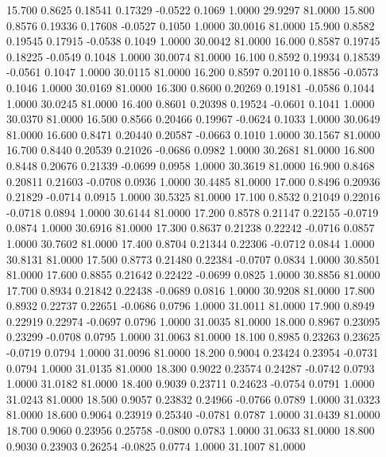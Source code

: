   15.700   0.8625   0.18541   0.17329  -0.0522   0.1069   1.0000  29.9297  81.0000
  15.800   0.8576   0.19336   0.17608  -0.0527   0.1050   1.0000  30.0016  81.0000
  15.900   0.8582   0.19545   0.17915  -0.0538   0.1049   1.0000  30.0042  81.0000
  16.000   0.8587   0.19745   0.18225  -0.0549   0.1048   1.0000  30.0074  81.0000
  16.100   0.8592   0.19934   0.18539  -0.0561   0.1047   1.0000  30.0115  81.0000
  16.200   0.8597   0.20110   0.18856  -0.0573   0.1046   1.0000  30.0169  81.0000
  16.300   0.8600   0.20269   0.19181  -0.0586   0.1044   1.0000  30.0245  81.0000
  16.400   0.8601   0.20398   0.19524  -0.0601   0.1041   1.0000  30.0370  81.0000
  16.500   0.8566   0.20466   0.19967  -0.0624   0.1033   1.0000  30.0649  81.0000
  16.600   0.8471   0.20440   0.20587  -0.0663   0.1010   1.0000  30.1567  81.0000
  16.700   0.8440   0.20539   0.21026  -0.0686   0.0982   1.0000  30.2681  81.0000
  16.800   0.8448   0.20676   0.21339  -0.0699   0.0958   1.0000  30.3619  81.0000
  16.900   0.8468   0.20811   0.21603  -0.0708   0.0936   1.0000  30.4485  81.0000
  17.000   0.8496   0.20936   0.21829  -0.0714   0.0915   1.0000  30.5325  81.0000
  17.100   0.8532   0.21049   0.22016  -0.0718   0.0894   1.0000  30.6144  81.0000
  17.200   0.8578   0.21147   0.22155  -0.0719   0.0874   1.0000  30.6916  81.0000
  17.300   0.8637   0.21238   0.22242  -0.0716   0.0857   1.0000  30.7602  81.0000
  17.400   0.8704   0.21344   0.22306  -0.0712   0.0844   1.0000  30.8131  81.0000
  17.500   0.8773   0.21480   0.22384  -0.0707   0.0834   1.0000  30.8501  81.0000
  17.600   0.8855   0.21642   0.22422  -0.0699   0.0825   1.0000  30.8856  81.0000
  17.700   0.8934   0.21842   0.22438  -0.0689   0.0816   1.0000  30.9208  81.0000
  17.800   0.8932   0.22737   0.22651  -0.0686   0.0796   1.0000  31.0011  81.0000
  17.900   0.8949   0.22919   0.22974  -0.0697   0.0796   1.0000  31.0035  81.0000
  18.000   0.8967   0.23095   0.23299  -0.0708   0.0795   1.0000  31.0063  81.0000
  18.100   0.8985   0.23263   0.23625  -0.0719   0.0794   1.0000  31.0096  81.0000
  18.200   0.9004   0.23424   0.23954  -0.0731   0.0794   1.0000  31.0135  81.0000
  18.300   0.9022   0.23574   0.24287  -0.0742   0.0793   1.0000  31.0182  81.0000
  18.400   0.9039   0.23711   0.24623  -0.0754   0.0791   1.0000  31.0243  81.0000
  18.500   0.9057   0.23832   0.24966  -0.0766   0.0789   1.0000  31.0323  81.0000
  18.600   0.9064   0.23919   0.25340  -0.0781   0.0787   1.0000  31.0439  81.0000
  18.700   0.9060   0.23956   0.25758  -0.0800   0.0783   1.0000  31.0633  81.0000
  18.800   0.9030   0.23903   0.26254  -0.0825   0.0774   1.0000  31.1007  81.0000
